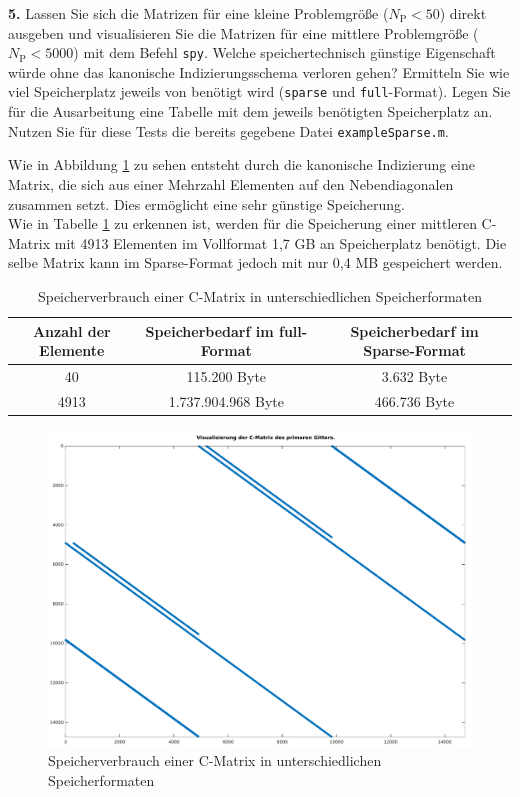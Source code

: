 \documentclass[Protokollheft.tex]{subfiles}
\begin{document}
        \begin{framed}
	\noindent \textbf{5.} Lassen Sie sich die Matrizen für eine kleine Problemgröße ($N_{\text{P}}<50$) direkt
                    ausgeben und visualisieren Sie die Matrizen für eine mittlere
                    Problemgröße ($N_{\text{P}}<5000$) mit dem Befehl \lstinline{spy}. Welche speichertechnisch günstige
                    Eigenschaft würde ohne das kanonische Indizierungsschema verloren gehen?
                    Ermitteln Sie wie viel Speicherplatz jeweils von \matlab benötigt wird
                    (\lstinline{sparse} und \lstinline{full}-Format). Legen Sie für die Ausarbeitung eine Tabelle mit dem jeweils benötigten Speicherplatz an. Nutzen Sie für diese Tests die bereits gegebene Datei \lstinline{exampleSparse.m}.\label{exer:spyStorage}
\end{framed}
\noindent
 Wie in Abbildung \ref{fig:visucmatrixprimgitt} zu sehen entsteht durch die kanonische Indizierung eine Matrix, die sich aus einer Mehrzahl Elementen auf den Nebendiagonalen zusammen setzt. Dies ermöglicht eine sehr günstige Speicherung. \\
 Wie in Tabelle \ref{tbl:speicherCMatrix} zu erkennen ist, werden für die Speicherung einer mittleren C-Matrix mit 4913 Elementen im Vollformat 1,7 GB an Speicherplatz benötigt. Die selbe Matrix kann im Sparse-Format jedoch mit nur 0,4 MB gespeichert werden. 
 \begin{table}[h!]
	
 \begin{tabular}{|c|c|c|}
 
 	\hline 
 	Anzahl der Elemente& Speicherbedarf im full-Format &  Speicherbedarf im Sparse-Format\\ 
 	\hline 
 	40& 115.200 Byte & 3.632 Byte \\ 
 	\hline 
 	4913& 1.737.904.968 Byte& 466.736 Byte \\ 
 	\hline 	
 \end{tabular} 	
\caption{Speicherverbrauch einer C-Matrix in unterschiedlichen Speicherformaten}
\label{tbl:speicherCMatrix}
  \end{table}
\begin{figure}[h!]
	\centering
	\includegraphics[width=0.5\linewidth]{VisuCMatrixPrimGitt}
	\caption{Speicherverbrauch einer C-Matrix in unterschiedlichen Speicherformaten}
	\label{fig:visucmatrixprimgitt}
\end{figure}
\\
\\
\\
\\
\\
\end{document}
